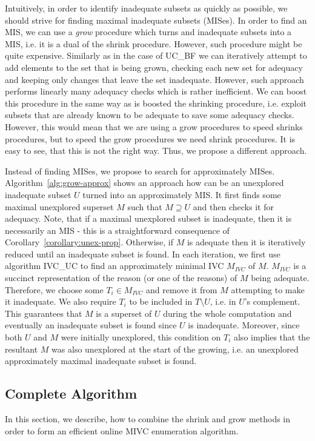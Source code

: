 Intuitively, in order to identify inadequate subsets as quickly as possible, we should strive for finding maximal inadequate subsets (MISes).  
In order to find an MIS, we can use a \emph{grow} procedure which turns and inadequate subsets into a MIS, i.e. it is a dual of the shrink procedure. However, such procedure might be quite expensive. Similarly as in the case of UC\_BF we can iteratively attempt to add elements to the set that is being
grown, checking each new set for adequacy and keeping only changes that
leave the set inadequate. However, such approach performs linearly many adequacy checks which is rather inefficient. We can boost this procedure in the same way as is boosted the shrinking procedure, i.e. exploit subsets that are already known to be adequate to save some adequacy checks. However, this would mean that we are using a grow procedures to speed shrinks procedures, but to speed the grow procedures we need shrink procedures. It is easy to see, that this is not the right way. Thus, we propose a different approach. 

Instead of finding MISes, we propose to search for approximately MISes. Algorithm~\ref{alg:grow-approx} shows an approach how can be an unexplored inadequate subset $U$ turned into an approximately MIS. It first finds some maximal unexplored superset $M$ such that $M \supseteq U$ and then checks it for adequacy. Note, that if a maximal unexplored subset is inadequate, then it is necessarily an MIS - this is a straightforward consequence of Corollary~\ref{corollary:unex-prop}. 
Otherwise, if $M$ is adequate then it is iteratively reduced until an inadequate subset is found. In each iteration, we first use algorithm IVC\_UC to find an approximately minimal IVC $M_{IVC}$ of $M$. $M_{IVC}$ is a succinct representation of the reason (or one of the reasons) of $M$ being adequate. Therefore, we choose some $T_i \in M_{IVC}$ and remove it from $M$ attempting to make it inadequate. We also require $T_i$ to be included in $T \setminus U$, i.e. in $U$'s complement. This guarantees that $M$ is a superset of $U$ during the whole computation and eventually an inadequate subset is found since $U$ is inadequate. Moreover, since both $U$ and $M$ were initially unexplored, this condition on $T_i$ also implies that the resultant $M$ was also unexplored at the start of the growing, i.e. an unexplored approximately maximal inadequate subset is found. 

\subsection{Complete Algorithm}
In this section, we describe, how to combine the shrink and grow methods in order to form an efficient online MIVC enumeration algorithm.

